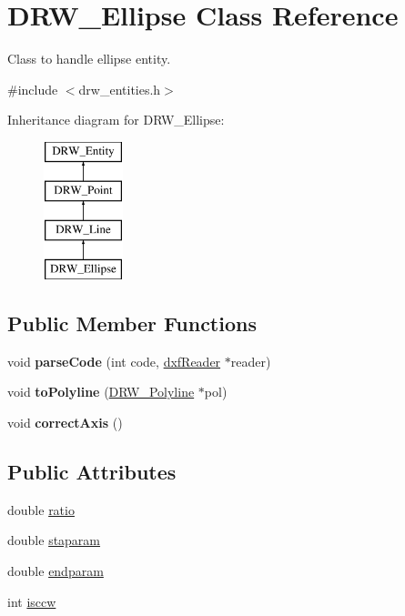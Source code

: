 \hypertarget{classDRW__Ellipse}{\section{D\-R\-W\-\_\-\-Ellipse Class Reference}
\label{classDRW__Ellipse}
}


Class to handle ellipse entity.  




{\ttfamily \#include $<$drw\-\_\-entities.\-h$>$}

Inheritance diagram for D\-R\-W\-\_\-\-Ellipse\-:\begin{figure}[H]
\begin{center}
\leavevmode
\includegraphics[height=4.000000cm]{classDRW__Ellipse}
\end{center}
\end{figure}
\subsection*{Public Member Functions}
\begin{DoxyCompactItemize}
\item 
\hypertarget{classDRW__Ellipse_a7e271b176d81110b92931514bddb2e6d}{void {\bfseries parse\-Code} (int code, \hyperlink{classdxfReader}{dxf\-Reader} $\ast$reader)}\label{classDRW__Ellipse_a7e271b176d81110b92931514bddb2e6d}

\item 
\hypertarget{classDRW__Ellipse_a50db2835775020b469572519304e7f61}{void {\bfseries to\-Polyline} (\hyperlink{classDRW__Polyline}{D\-R\-W\-\_\-\-Polyline} $\ast$pol)}\label{classDRW__Ellipse_a50db2835775020b469572519304e7f61}

\item 
\hypertarget{classDRW__Ellipse_af51db505ca2482be027739a9be86ba3c}{void {\bfseries correct\-Axis} ()}\label{classDRW__Ellipse_af51db505ca2482be027739a9be86ba3c}

\end{DoxyCompactItemize}
\subsection*{Public Attributes}
\begin{DoxyCompactItemize}
\item 
double \hyperlink{classDRW__Ellipse_a5f99577d5e97fa8e0d308a2ab52a2f95}{ratio}
\item 
double \hyperlink{classDRW__Ellipse_a8b9ca88b1d30755bdaa2de0e11116ede}{staparam}
\item 
double \hyperlink{classDRW__Ellipse_a69490d7e26d7c8fa602ef4a540b22d52}{endparam}
\item 
int \hyperlink{classDRW__Ellipse_a6a8cd9de5c300fde3c52c26daf66ac77}{isccw}
\end{DoxyCompactItemize}
